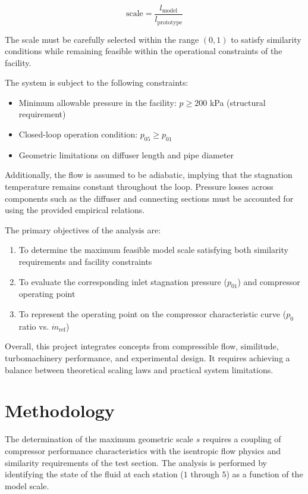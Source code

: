 \documentclass[12pt]{article}
\begin{document}
\begin{equation}
\text{scale} = \frac{l_{\text{model}}}{l_{\text{prototype}}}
\end{equation}

The scale must be carefully selected within the range $(0,1)$ to satisfy similarity conditions while remaining feasible within the operational constraints of the facility.

The system is subject to the following constraints:

\begin{itemize}
    \item Minimum allowable pressure in the facility: $p \geq 200$ kPa (structural requirement)
    \item Closed-loop operation condition: $p_{05} \geq p_{01}$
    \item Geometric limitations on diffuser length and pipe diameter
\end{itemize}

Additionally, the flow is assumed to be adiabatic, implying that the stagnation temperature remains constant throughout the loop. Pressure losses across components such as the diffuser and connecting sections must be accounted for using the provided empirical relations.

The primary objectives of the analysis are:

\begin{enumerate}
    \item To determine the maximum feasible model scale satisfying both similarity requirements and facility constraints
    \item To evaluate the corresponding inlet stagnation pressure ($p_{01}$) and compressor operating point
    \item To represent the operating point on the compressor characteristic curve ($p_0$ ratio vs. $\dot{m}_{\text{ref}}$)
\end{enumerate}

Overall, this project integrates concepts from compressible flow, similitude, turbomachinery performance, and experimental design. It requires achieving a balance between theoretical scaling laws and practical system limitations.
\newpage

\section{Methodology}

The determination of the maximum geometric scale $s$ requires a coupling of compressor performance characteristics with the isentropic flow physics and similarity requirements of the test section. The analysis is performed by identifying the state of the fluid at each station ($1$ through $5$) as a function of the model scale.
\end{document}
